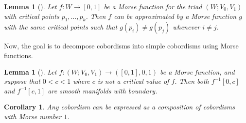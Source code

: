 \documentclass[reqno]{amsart}
\newtheorem{lemma}[theorem]{Lemma}
\newtheorem{corollary}[theorem]{Corollary}
\theoremstyle{definition}
\theoremstyle{remark}
\begin{document}
   \begin{lemma}[]
       Let $f \colon W \to \left[ 0,1 \right] $ be a Morse
       function for the triad $\left( W;
       V_0,V_1\right) $ with critical points $p_1,\ldots,p_k$.
       Then $f$ can be approximated by a Morse function $g$ 
       with the same critical points such that
       $g\left( p_i \right)  \neq g\left( p_j \right) $ whenever
       $i \neq j$.
   \end{lemma}



   Now, the goal is to decompose cobordisms into
   simple cobordisms using Morse functions.

   \begin{lemma}[]
       Let $f \colon \left( W; V_0, V_1 \right) 
       \to \left( \left[ 0,1 \right] , 0, 1 \right) $ be
       a Morse function, and suppose that
       $0 < c < 1$ where $c $ is not a critical value of
       $f$. Then both
       $f^{-1}\left[ 0,c \right] $ and
       $f^{-1}\left[ c,1 \right] $ are smooth
       manifolds with boundary.
   \end{lemma}

   \begin{corollary}
       Any cobordism can be expressed as a composition
       of cobordisms with Morse number $1$.
   \end{corollary}
   

\printbibliography
\end{document}
